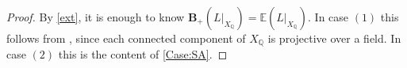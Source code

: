 \documentclass[a4paper,12pt]{book}
\newcommand{\BS}{\mathbf{B}_{+}}
\begin{document}
\begin{proof}

	By \autoref{ext}, it is enough to know $\BS(L|_{X_{\mathbb{Q}}})=\mathbb{E}(L|_{X_{\mathbb{Q}}})$. In case $(1)$ this follows from \cite[Theorem 1.3]{birkar2017augmented}, since each connected component of $X_{\mathbb{Q}}$ is projective over a field. In case $(2)$ this is the content of \autoref{Case:SA}.
\end{proof}





\end{document}
